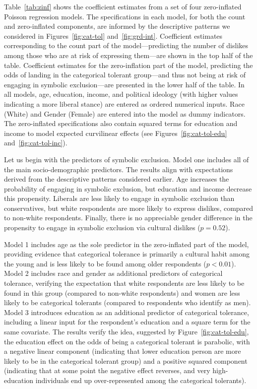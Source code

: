 \documentclass[12pt]{article}
\begin{document}
Table~\ref{tab:zinf} shows the coefficient estimates from a set of four zero-inflated Poisson regression models. The specifications in each model, for both the count and zero-inflated components, are informed by the descriptive patterns we considered in Figures~\ref{fig:cat-tol} and~\ref{fig:grd-int}. Coefficient estimates corresponding to the count part of the model---predicting the number of dislikes among those who are at risk of expressing them---are shown in the top half of the table. Coefficient estimates for the zero-inflation part of the model, predicting the odds of landing in the categorical tolerant group---and thus not being at risk of engaging in symbolic exclusion---are presented in the lower half of the table. In all models, age, education, income, and political ideology (with higher values indicating a more liberal stance) are entered as ordered numerical inputs. Race (White) and Gender (Female) are entered into the model as dummy indicators. The zero-inflated specifications also contain squared terms for education and income to model expected curvilinear effects (see Figures~\ref{fig:cat-tol-edu} and~\ref{fig:cat-tol-inc}).

Let us begin with the predictors of symbolic exclusion. Model one includes all of the main socio-demographic predictors. The results align with expectations derived from the descriptive patterns considered earlier. Age increases the probability of engaging in symbolic exclusion, but education and income decrease this propensity. Liberals are less likely to engage in symbolic exclusion than conservatives, but white respondents are more likely to express dislikes, compared to non-white respondents. Finally, there is no appreciable gender difference in the propensity to engage in symbolic exclusion via cultural dislikes ($p = 0.52$).

Model 1 includes age as the sole predictor in the zero-inflated part of the model, providing evidence that categorical tolerance is primarily a cultural habit among the young and is less likely to be found among older respondents ($p < 0.01$). Model 2 includes race and gender as additional predictors of categorical tolerance, verifying the expectation that white respondents are less likely to be found in this group (compared to non-white respondents) and women are less likely to be categorical tolerants (compared to respondents who identify as men). Model 3 introduces education as an additional predictor of categorical tolerance, including a linear input for the respondent's education and a square term for the same covariate. The results verify the idea, suggested by Figure~\ref{fig:cat-tol-edu}, the education effect on the odds of being a categorical tolerant is parabolic, with a negative linear component (indicating that lower education person are more likely to be in the categorical tolerant group) and a positive squared component (indicating that at some point the negative effect reverses, and very high-education individuals end up over-represented among the categorical tolerants). 
\end{document}
